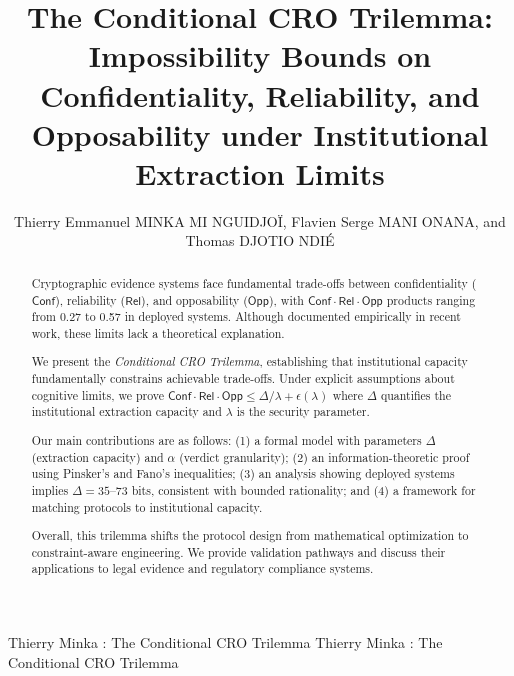 \documentclass{ieeeaccess}
\newcommand{\Conf}{\mathsf{Conf}}
\newcommand{\Rel}{\mathsf{Rel}}
\newcommand{\Opp}{\mathsf{Opp}}
\begin{document}

\title{The Conditional CRO Trilemma: Impossibility Bounds on Confidentiality, Reliability, and Opposability under Institutional Extraction Limits}

\author{
Thierry Emmanuel \uppercase{Minka Mi Nguidjoï},
Flavien Serge \uppercase{Mani Onana}, and
Thomas \uppercase{Djotio Ndié}
}

\address[1]{Laboratory of Mathematical Engineering and Information Systems, National Advanced School of Engineering, University of Yaoundé I, Cameroon (e-mail: minkathierry@gmail.com, serge.mani@digitworldacademy.com, tdjotio@gmail.com)}

\address[2]{Supreme State Audit Office, Yaoundé, Cameroon (e-mail: minkathierry@gmail.com)}


\markboth
{Thierry Minka \headeretal: The Conditional CRO Trilemma}
{Thierry Minka \headeretal: The Conditional CRO Trilemma}


\begin{abstract}
Cryptographic evidence systems face fundamental trade-offs between confidentiality ($\Conf$), reliability ($\Rel$), and opposability ($\Opp$), with $\Conf\cdot\Rel\cdot\Opp$ products ranging from 0.27 to 0.57 in deployed systems. Although  documented empirically in recent work, these limits lack a theoretical explanation.


We present the \emph{Conditional CRO Trilemma}, establishing that institutional capacity fundamentally constrains achievable trade-offs. Under explicit assumptions about cognitive limits, we prove $\Conf\cdot\Rel\cdot\Opp \leq \Delta/\lambda + \epsilon(\lambda)$ where $\Delta$ quantifies the institutional extraction capacity and $\lambda$ is the security parameter.


Our main contributions are as follows: (1) a formal model with parameters $\Delta$ (extraction capacity) and $\alpha$ (verdict granularity); (2) an information-theoretic proof using Pinsker's and Fano's inequalities; (3) an analysis showing deployed systems implies $\Delta = 35$--73 bits, consistent with bounded rationality; and (4) a framework for matching protocols to institutional capacity.


Overall, this trilemma shifts the protocol design from mathematical optimization to constraint-aware engineering. We provide validation pathways and discuss their applications to legal evidence and regulatory compliance systems.
\end{abstract}
\end{document}
